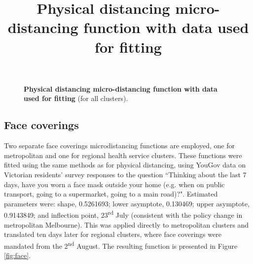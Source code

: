 \begin{figure}[ht]
    \caption{\textbf{Physical distancing micro-distancing function with data used for fitting} (for all clusters).}
    \title{Physical distancing micro-distancing function with data used for fitting}
    \label{fig:physical}
\end{figure}

\subsection{Face coverings}
Two separate face coverings microdistancing functions are employed, one for metropolitan and one for regional health service clusters. These functions were fitted using the same methods as for physical distancing, using YouGov data on Victorian residents' survey responses to the question ``Thinking about the last 7 days, have you worn a face mask outside your home (e.g. when on public transport, going to a supermarket, going to a main road)?". Estimated parameters were: shape, 0.5261693; lower asymptote, 0.130469; upper asymptote, 0.9143849; and inflection point, 23\textsuperscript{rd} July (consistent with the policy change in metropolitan Melbourne). This was applied directly to metropolitan clusters and translated ten days later for regional clusters, where face coverings were mandated from the 2\textsuperscript{nd} August. The resulting function is presented in Figure \ref{fig:face}.

